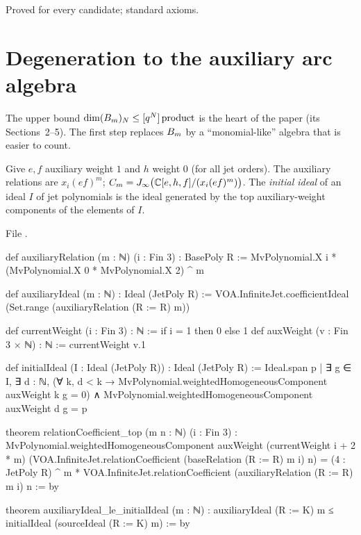 \begin{status}
Proved for every candidate; standard axioms.
\end{status}

\section{Degeneration to the auxiliary arc algebra}\label{l20:sec:m1}

The upper bound $\dim(B_m)_N\le[q^N]\,\mathrm{product}$ is the heart of the paper (its Sections~2--5). The first
step replaces $B_m$ by a ``monomial-like'' algebra that is easier to count.

\begin{definition}\label{l20:def:aux}
Give $e,f$ auxiliary weight $1$ and $h$ weight $0$ (for all jet orders). The auxiliary relations are
$x_i(ef)^m$; $C_m=J_\infty\bigl({\mathbb{C}}[e,h,f]/(x_i(ef)^m)\bigr)$. The \emph{initial ideal} of an ideal $I$ of jet
polynomials is the ideal generated by the top auxiliary-weight components of the elements of $I$.
\end{definition}
\noindent File .
\begin{leancode}
def auxiliaryRelation (m : ℕ) (i : Fin 3) : BasePoly R :=
  MvPolynomial.X i * (MvPolynomial.X 0 * MvPolynomial.X 2) ^ m

def auxiliaryIdeal (m : ℕ) : Ideal (JetPoly R) :=
  VOA.InfiniteJet.coefficientIdeal (Set.range (auxiliaryRelation (R := R) m))

def currentWeight (i : Fin 3) : ℕ := if i = 1 then 0 else 1
def auxWeight (v : Fin 3 × ℕ) : ℕ := currentWeight v.1

def initialIdeal (I : Ideal (JetPoly R)) : Ideal (JetPoly R) :=
  Ideal.span {p | ∃ g ∈ I, ∃ d : ℕ,
    (∀ k, d < k → MvPolynomial.weightedHomogeneousComponent auxWeight k g = 0) ∧
      MvPolynomial.weightedHomogeneousComponent auxWeight d g = p}

theorem relationCoefficient_top (m n : ℕ) (i : Fin 3) :
    MvPolynomial.weightedHomogeneousComponent auxWeight (currentWeight i + 2 * m)
      (VOA.InfiniteJet.relationCoefficient (baseRelation (R := R) m i) n) =
        (4 : JetPoly R) ^ m *
          VOA.InfiniteJet.relationCoefficient (auxiliaryRelation (R := R) m i) n := by

theorem auxiliaryIdeal_le_initialIdeal (m : ℕ) :
    auxiliaryIdeal (R := K) m ≤ initialIdeal (sourceIdeal (R := K) m) := by
\end{leancode}
